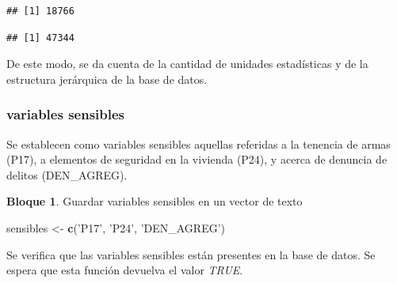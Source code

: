 \documentclass[]{book}
\newenvironment{Shaded}{\begin{snugshade}}{\end{snugshade}}
\newcommand{\KeywordTok}[1]{\textcolor[rgb]{0.13,0.29,0.53}{\textbf{#1}}}
\newcommand{\NormalTok}[1]{#1}
\newcommand{\OperatorTok}[1]{\textcolor[rgb]{0.81,0.36,0.00}{\textbf{#1}}}
\newcommand{\StringTok}[1]{\textcolor[rgb]{0.31,0.60,0.02}{#1}}
\theoremstyle{definition}
\theoremstyle{definition}
\newtheorem{example}{Bloque}[chapter]
\theoremstyle{definition}
\theoremstyle{definition}
\theoremstyle{remark}
\begin{document}
\begin{Shaded}
\end{Shaded}

\begin{verbatim}
## [1] 18766
\end{verbatim}

\begin{Shaded}
\end{Shaded}

\begin{verbatim}
## [1] 47344
\end{verbatim}

De este modo, se da cuenta de la cantidad de unidades estadísticas y de la estructura jerárquica de la base de datos.

\hypertarget{variables-sensibles}{%
\subsubsection{variables sensibles}\label{variables-sensibles}}

Se establecen como variables sensibles aquellas referidas a la tenencia de armas (P17), a elementos de seguridad en la vivienda (P24), y acerca de denuncia de delitos (DEN\_AGREG).

\begin{example}
\protect\hypertarget{exm:bloque7nbm}{}{\label{exm:bloque7nbm} }Guardar variables sensibles en un vector de texto
\end{example}

\begin{Shaded}
\begin{Highlighting}[]
\NormalTok{sensibles <-}\StringTok{ }\KeywordTok{c}\NormalTok{(}\StringTok{'P17'}\NormalTok{,}
               \StringTok{'P24'}\NormalTok{,}
               \StringTok{'DEN_AGREG'}\NormalTok{)}
\end{Highlighting}
\end{Shaded}

Se verifica que las variables sensibles están presentes en la base de datos. Se espera que esta función devuelva el valor \emph{TRUE}.
\end{document}

